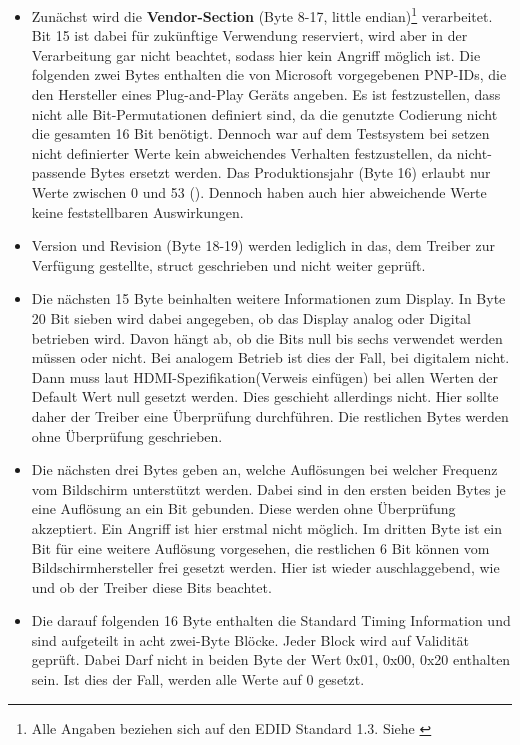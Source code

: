 \begin{itemize}
	\item Zunächst wird die  \textbf{Vendor-Section} (Byte 8-17, little endian)\footnote{Alle Angaben beziehen sich auf den EDID Standard 1.3. Siehe \cite[S.9ff]{Edid13Specification}} verarbeitet.
	Bit 15 ist dabei für zukünftige Verwendung reserviert, wird aber in der Verarbeitung gar nicht beachtet, sodass hier kein Angriff möglich ist. 
	Die folgenden zwei Bytes enthalten die von Microsoft vorgegebenen PNP-IDs, die den Hersteller eines Plug-and-Play Geräts angeben. Es ist festzustellen, dass nicht alle Bit-Permutationen definiert sind, da die genutzte Codierung nicht die gesamten 16 Bit benötigt. Dennoch war auf dem Testsystem bei setzen nicht definierter Werte kein abweichendes Verhalten festzustellen, da nicht-passende Bytes ersetzt werden.
	Das Produktionsjahr (Byte 16) erlaubt  nur Werte zwischen 0 und 53 (\cite[S.11]{Edid13Specification}). Dennoch haben auch hier abweichende Werte keine feststellbaren Auswirkungen.
	\item Version und Revision (Byte 18-19) werden lediglich in das, dem Treiber zur Verfügung gestellte, struct geschrieben und nicht weiter geprüft. 
	\item 	Die nächsten 15 Byte beinhalten weitere Informationen zum Display.
	In Byte 20 Bit sieben wird dabei angegeben, ob das Display analog oder Digital betrieben wird. Davon hängt ab, ob die Bits null bis sechs verwendet werden müssen oder nicht. Bei analogem Betrieb ist dies der Fall, bei digitalem nicht. Dann muss laut HDMI-Spezifikation(Verweis einfügen) bei allen Werten der Default Wert null gesetzt werden. Dies geschieht allerdings nicht. Hier sollte daher der Treiber eine Überprüfung durchführen. Die restlichen Bytes werden ohne Überprüfung geschrieben.
	\item 	Die nächsten drei Bytes geben an, welche Auflösungen bei welcher Frequenz vom Bildschirm unterstützt werden. Dabei sind in den ersten beiden Bytes je eine Auflösung an ein Bit gebunden. Diese werden ohne Überprüfung akzeptiert. Ein Angriff ist hier erstmal nicht möglich. Im dritten Byte ist ein Bit für eine weitere Auflösung vorgesehen, die restlichen 6 Bit können vom Bildschirmhersteller frei gesetzt werden. Hier ist wieder auschlaggebend, wie und ob der Treiber diese Bits beachtet.
	\item Die darauf folgenden 16 Byte enthalten die Standard Timing Information und sind aufgeteilt in acht zwei-Byte Blöcke. Jeder Block wird auf Validität geprüft. Dabei Darf nicht in beiden Byte der Wert 0x01, 0x00, 0x20 enthalten sein. Ist dies der Fall, werden alle Werte auf 0 gesetzt.

\end{itemize}
